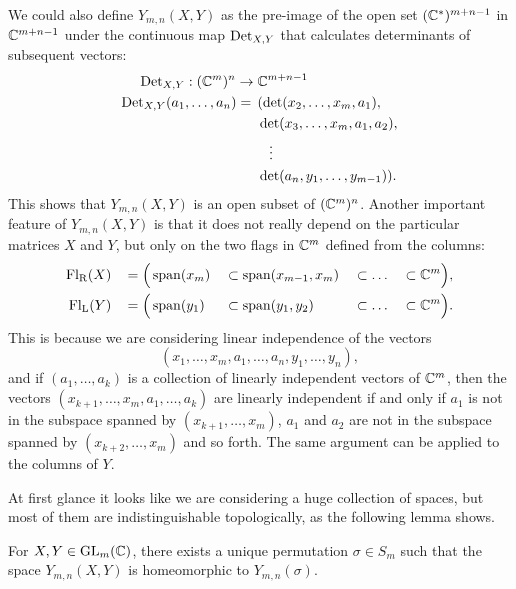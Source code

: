 We could also define $Y_{m,n}(X,Y)$ as the
pre-image of the open set $(\mathbb{C}^*)^{m+n-1}$ in $\mathbb{C}^{m+n-1}$ under the
continuous map $\operatorname{Det}_{X,Y}$ that calculates determinants of subsequent
vectors:
\begin{align*}
  \operatorname{Det}_{X,Y} : (\mathbb{C}^m)^n \to &\;\mathbb{C}^{m+n-1} \\
  \operatorname{Det}_{X,Y}(a_1,\dots,a_n) = \,&\; (\det(x_2,\dots,x_m,a_1),\\
  &\; \det(x_3,\dots,x_m,a_1,a_2), \\
  &\;\;\;\; \vdots\\
  &\; \det(a_n,y_1,\dots,y_{m-1})).
\end{align*}
This shows that $Y_{m,n}(X,Y)$ is an open subset of
$(\mathbb{C}^m)^n$. Another important
feature of $Y_{m,n}(X,Y)$ is that it does not really depend on the
particular matrices
$X$ and $Y$,
but only on the two flags in $\mathbb{C}^{m}$ defined from the columns:
\begin{alignat*}{5}
  \mathrm{Fl_R}(X)\, &&= \Big(&\operatorname{span}(x_m) &&\subset \operatorname{span}(x_{m-1},x_m)
  &&\subset \dots &&\subset \mathbb{C}^m\Big), \\
  \mathrm{Fl_L}(Y)\, &&= \Big(&\operatorname{span}(y_1) &&\subset \operatorname{span}(y_1,y_2)
  &&\subset \dots &&\subset \mathbb{C}^m\Big).
\end{alignat*}
This is because we are considering linear independence of the vectors
\[ (x_1,\dots,x_m,a_1,\dots,a_n,y_1,\dots,y_n), \]
and if $(a_1,\dots,a_{k})$ is a collection of linearly independent
vectors of $\mathbb{C}^m$, then the vectors
$(x_{k+1},\dots,x_m,a_1,\dots,a_{k})$ are
linearly independent if and only if $a_1$ is not in the subspace
spanned by $(x_{k+1},\dots,x_m)$, $a_1$ and $a_2$ are not in the
subspace spanned by $(x_{k+2},\dots,x_m)$ and so forth. The same
argument can be applied to the columns of $Y$.

At first glance it looks like we are considering a huge collection of
spaces, but most of them are indistinguishable topologically, as the
following lemma shows.

\begin{lemma} \label{lem:rum-perm}
  For $X,Y\in \operatorname{GL}_m(\mathbb{C})$, there exists a unique permutation $\sigma
  \in S_m$ such that the space
  $Y_{m,n}(X,Y)$ is homeomorphic to $Y_{m,n}(\sigma)$.
\end{lemma}

